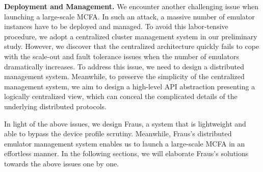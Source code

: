 \documentclass[conference]{IEEEtranl}
\begin{document}
	\textbf{Deployment and Management.} 
	We encounter another challenging issue when launching a large-scale MCFA. In such an attack, a massive number of emulator instances have to be deployed and managed. To avoid this labor-tensive procedure,
	we adopt a centralized cluster management system \cite{mutti2015baredroid} in our preliminary study. However, we discover that the centralized architecture quickly fails to cope with the scale-out and fault tolerance issues when the number of emulators dramatically increases. To address this issue, we need to design a distributed management system. Meanwhile, to preserve the simplicity of the centralized management system, we aim to design a high-level API abstraction presenting a logically centralized view, which can conceal the complicated details of the underlying distributed protocols. 


	In light of the above issues, we design Fraus, a system that is lightweight and able to bypass the device profile scrutiny. Meanwhile, Fraus's distributed emulator management system enables us to launch a large-scale MCFA in an effortless manner. In the following sections, we will elaborate Fraus's solutions towards the above issues one by one.










\end{document}

